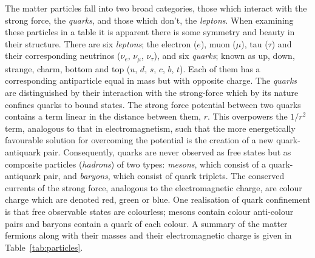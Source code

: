 The matter particles fall into two broad categories, those which interact with the strong force, the \textit{quarks}, and those which don't, the \textit{leptons}. When examining these particles in a table it is apparent there is some symmetry and beauty in their structure. There are six \textit{leptons}; the electron ($e$), muon ($\mu$), tau ($\tau$) and their corresponding neutrinos ($\nu_{e}$, $\nu_{\mu}$, $\nu_{\tau}$), and six \textit{quarks}; known as up, down, strange, charm, bottom and top ($u$, $d$, $s$, $c$, $b$, $t$). Each of them has a corresponding antiparticle equal in mass but with opposite charge. The \textit{quarks} are distinguished by their interaction with the strong-force which by its nature confines quarks to bound states. The strong force potential between two quarks contains a term linear in the distance between them, $r$. This overpowers the $1/r^{2}$ term, analogous to that in electromagnetism, such that the more energetically favourable solution for overcoming the potential is the creation of a new quark-antiquark pair. Consequently, quarks are never observed as free states but as composite particles (\textit{hadrons}) of two types: \textit{mesons}, which consist of a quark-antiquark pair, and \textit{baryons}, which consist of quark triplets. The conserved currents of the strong force, analogous to the electromagnetic charge, are colour charge which are denoted red, green or blue. One realisation of quark confinement is that free observable states are colourless; mesons contain colour anti-colour pairs and baryons contain a quark of each colour. A summary of the matter fermions along with their masses and their electromagnetic charge is given in Table~\ref{tab:particles}.

